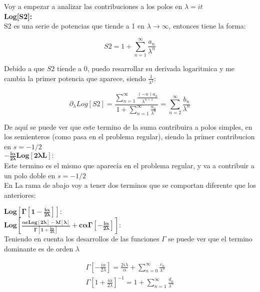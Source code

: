 Voy a empezar a analizar las contribuciones a los polos en $\lambda = i t$ \\

\textbf{Log[S2]:} \\

S2 es una serie de potencias que tiende a 1 en $\lambda \rightarrow \infty$, entonces tiene la forma:

\begin{equation}
S2 = 1 + \sum _{n=1} ^{\infty} \frac{a _n}{\lambda ^n}
\end{equation}

Debido a que $S2$ tiende a $0$, puedo resarrollar su derivada logaritmica y me cambia la primer potencia que aparece, siendo $\frac{1}{\lambda ^ 2}$:

\begin{equation}
\partial _{\lambda} Log[S2] = 
\frac{
    \sum _{n=1} ^{\infty} \frac{(-n) a_n}{\lambda ^{n+1}} }{1 + \sum _{n=1} ^{\infty} \frac{a _n}{\lambda ^n} }
= \sum _{n=2} ^{\infty} \frac{b _n}{\lambda ^n}
\end{equation}

De aquí se puede ver que este termino de la suma contribuira a polos simples, en los semienteros (como pasa en el problema regular), siendo la primer contribucion en $s=-1/2$ \\

$\mathbf{
- \frac{i \alpha}{2 \lambda} Log[2 \lambda L]} : 
$ \\

Este termino es el mismo que aparecía en el problema regular, y va a contribuir a un polo doble en $s=-1/2$  \\



En La rama de abajo voy a tener dos terminos que se comportan diferente que los anteriores:

$\mathbf{
		Log[\Gamma [ 1 - \frac{i \alpha}{2 \lambda} ] ]
		}: 
		$ \\


$\mathbf{
Log[
	\frac{\alpha c Log[2 \lambda] - \lambda f[\lambda] }{\Gamma \left[1 + \frac{i \alpha}{ 2 \lambda} \right] } + 
	c \alpha \Gamma \left[ - \frac{i \alpha}{2 \lambda} \right] ] :
}$ \\

Teniendo en cuenta los desarrollos de las funciones $\Gamma$ se puede ver que el termino dominante es de orden $\lambda$


\begin{equation}
\begin{array}{c}
\Gamma [- \frac{i \alpha}{2 \lambda}] = 
\frac{2 i \lambda}{\alpha}  + 
\sum _{n=0} ^{\infty} \frac{c _n}{\lambda ^n} \\
\Gamma \left[ 1 + \frac{i \alpha}{2 \lambda} \right] ^{-1} = 1 + 
\sum _{n=1} ^{\infty} \frac{d _n}{\lambda ^n}
\end{array}
\end{equation}

